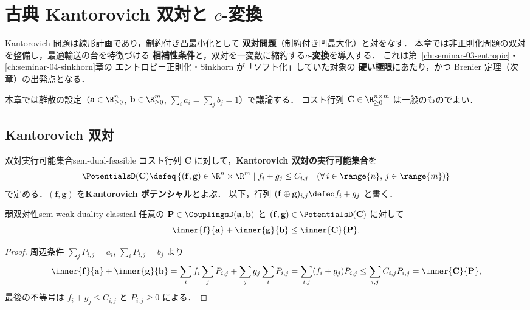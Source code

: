 \chapter{古典 Kantorovich 双対と \texorpdfstring{$c$}{c}-変換}
\label{ch:seminar-06-dual}

Kantorovich 問題は線形計画であり，制約付き凸最小化として
\textbf{双対問題}（制約付き凹最大化）と対をなす．
本章では非正則化問題の双対を整備し，最適輸送の台を特徴づける
\textbf{相補性条件}と，双対を一変数に縮約する\textbf{$c$-変換}を導入する．
これは第~\ref{ch:seminar-03-entropic}・\ref{ch:seminar-04-sinkhorn}章の
エントロピー正則化・Sinkhorn が「ソフト化」していた対象の
\textbf{硬い極限}にあたり，かつ Brenier 定理（次章）の出発点となる．

本章では離散の設定（$\mathbf{a} \in \R_{\geq 0}^n$, $\mathbf{b} \in \R_{\geq 0}^m$,
$\sum_i a_i = \sum_j b_j = 1$）で議論する．
コスト行列 $\mathbf{C} \in \R_{\geq 0}^{n \times m}$ は一般のものでよい．

\section{Kantorovich 双対}
\label{sec:sem-kantorovich-dual}

\begin{definition}{双対実行可能集合}{sem-dual-feasible}
  コスト行列 $\mathbf{C}$ に対して，\textbf{Kantorovich 双対の実行可能集合}を
  \[
    \PotentialsD(\mathbf{C})
    \defeq
    \left\{
      (\mathbf{f}, \mathbf{g}) \in \R^n \times \R^m
      \;\middle|\;
      f_i + g_j \leq C_{i,j}
      \quad (\forall\, i \in \range{n},\, j \in \range{m})
    \right\}
  \]
  で定める．$(\mathbf{f}, \mathbf{g})$ を\textbf{Kantorovich ポテンシャル}とよぶ．
  以下，行列 $(\mathbf{f} \oplus \mathbf{g})_{i,j} \defeq f_i + g_j$ と書く．
\end{definition}

\begin{proposition}{弱双対性}{sem-weak-duality-classical}
  任意の $\mathbf{P} \in \CouplingsD(\mathbf{a}, \mathbf{b})$ と
  $(\mathbf{f}, \mathbf{g}) \in \PotentialsD(\mathbf{C})$ に対して
  \[
    \inner{\mathbf{f}}{\mathbf{a}} + \inner{\mathbf{g}}{\mathbf{b}}
    \leq
    \inner{\mathbf{C}}{\mathbf{P}}.
  \]
\end{proposition}

\begin{proof}
  周辺条件 $\sum_j P_{i,j} = a_i$, $\sum_i P_{i,j} = b_j$ より
  \[
    \inner{\mathbf{f}}{\mathbf{a}} + \inner{\mathbf{g}}{\mathbf{b}}
    = \sum_i f_i \sum_j P_{i,j} + \sum_j g_j \sum_i P_{i,j}
    = \sum_{i,j} (f_i + g_j) P_{i,j}
    \leq \sum_{i,j} C_{i,j} P_{i,j}
    = \inner{\mathbf{C}}{\mathbf{P}},
  \]
  最後の不等号は $f_i + g_j \leq C_{i,j}$ と $P_{i,j} \geq 0$ による．
\end{proof}

